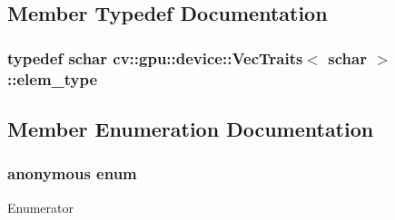 \subsection{Member Typedef Documentation}
\hypertarget{structcv_1_1gpu_1_1device_1_1VecTraits_3_01schar_01_4_a70d72b11f7b0a4f9704e419f856d35ab}{
\subsubsection[{elem\-\_\-type}]{\setlength{\rightskip}{0pt plus 5cm}typedef {\bf schar} {\bf cv\-::gpu\-::device\-::\-Vec\-Traits}$<$ {\bf schar} $>$\-::{\bf elem\-\_\-type}}}\label{structcv_1_1gpu_1_1device_1_1VecTraits_3_01schar_01_4_a70d72b11f7b0a4f9704e419f856d35ab}


\subsection{Member Enumeration Documentation}
\hypertarget{structcv_1_1gpu_1_1device_1_1VecTraits_3_01schar_01_4_a23539070e1678601e74686b53e4a974b}{\subsubsection[{anonymous enum}]{\setlength{\rightskip}{0pt plus 5cm}anonymous enum}}\label{structcv_1_1gpu_1_1device_1_1VecTraits_3_01schar_01_4_a23539070e1678601e74686b53e4a974b}
\begin{Desc}
\item[Enumerator]\par
\begin{description}
\item[{\em 
\hypertarget{structcv_1_1gpu_1_1device_1_1VecTraits_3_01schar_01_4_a23539070e1678601e74686b53e4a974ba37e2cd4dde4f874a49c42458faa85b98}{cn}\label{structcv_1_1gpu_1_1device_1_1VecTraits_3_01schar_01_4_a23539070e1678601e74686b53e4a974ba37e2cd4dde4f874a49c42458faa85b98}
}]\end{description}
\end{Desc}


